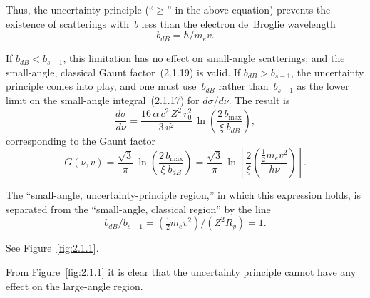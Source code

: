 \noindent Thus, the uncertainty principle (``$\ge$'' in the above
equation) prevents the existence of scatterings with~$b$ less than the
electron de~Broglie wavelength
\begin{equation}
  b_{dB} = \hbar / m_e v.
  \tag{2.1.20}
\end{equation}

If $b_{dB} < b_{s-1}$, this limitation has no effect on small-angle
scatterings; and the small-angle, classical Gaunt factor~(2.1.19) is
valid.  If $b_{dB} > b_{s-1}$, the uncertainty principle comes into
play, and one must use~$b_{dB}$ rather than~$b_{s-1}$ as the lower
limit on the small-angle integral~(2.1.17) for $d\sigma/d\nu$.  The
result is
\begin{equation}
  \frac{d\sigma}{d\nu}
  = \frac{16\,\alpha\,c^{2}\,Z^{2}\,r_0^{2}}{3\,v^{2}}\,
    \ln\!\left(\frac{2\,b_{\max}}{\xi\;b_{dB}}\right),
  \tag{2.1.21}
\end{equation}
corresponding to the Gaunt factor
\begin{equation}
  G(\nu,v)
  = \frac{\sqrt{3}}{\pi}\,
    \ln\!\left(\frac{2\,b_{\max}}{\xi\;b_{dB}}\right)
  = \frac{\sqrt{3}}{\pi}\,
    \ln\!\left[
      \frac{2}{\xi}
      \left(\frac{\tfrac{1}{2}m_e v^{2}}{h\nu}\right)
    \right].
  \tag{2.1.22}
\end{equation}

The ``small-angle, uncertainty-principle region,'' in which this
expression holds, is separated from the ``small-angle, classical
region'' by the line
\begin{equation}
  b_{dB}/b_{s-1}
  = (\tfrac{1}{2}m_e v^{2})/(Z^{2}R_y) = 1.
\end{equation}

\noindent See Figure~\ref{fig:2.1.1}.

From Figure~\ref{fig:2.1.1} it is clear that the uncertainty principle
cannot have any effect on the large-angle region.



